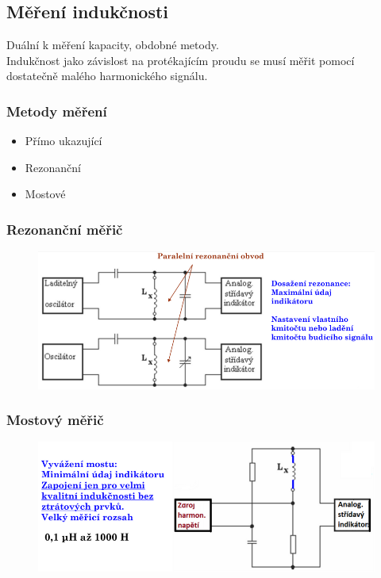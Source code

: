\subsection{Měření indukčnosti}
Duální k měření kapacity, obdobné metody.\\
Indukčnost jako závislost na protékajícím proudu se musí měřit pomocí dostatečně malého harmonického signálu.\\
\subsubsection{Metody měření}
\begin{itemize}
    \item Přímo ukazující
    \item Rezonanční
    \item Mostové
\end{itemize}

\subsubsection{Rezonanční měřič}
\begin{figure}[h!]
    \centering
    \includegraphics[scale = 0.5]{images/RezonMerL.png}
\end{figure}

\subsubsection{Mostový měřič}
\begin{figure}[h!]
    \centering
    \includegraphics[scale = 0.5]{images/MostMerL1.png}
\end{figure}

